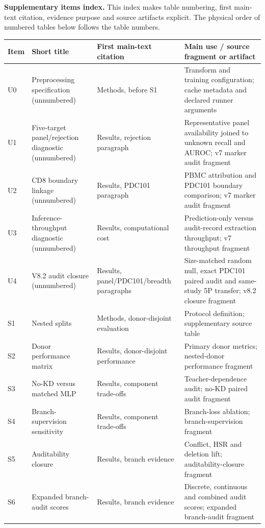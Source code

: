 \documentclass[10pt]{article}
\begin{document}
\begin{center}
\textbf{Supplementary items index.} This index makes table numbering, first main-text citation, evidence purpose and source artifacts explicit. The physical order of numbered tables below follows the table numbers.

\scriptsize
\setlength{\tabcolsep}{2.5pt}
\begin{tabularx}{\textwidth}{lllX}
\toprule
Item & Short title & First main-text citation & Main use / source fragment or artifact \\
\midrule
U0 & Preprocessing specification (unnumbered) & Methods, before S1 & Transform and training configuration; cache metadata and declared runner arguments \\
U1 & Five-target panel/rejection diagnostic (unnumbered) & Results, rejection paragraph & Representative panel availability joined to unknown recall and AUROC; v7 marker audit fragment \\
U2 & CD8 boundary linkage (unnumbered) & Results, PDC101 paragraph & PBMC attribution and PDC101 boundary comparison; v7 marker audit fragment \\
U3 & Inference-throughput diagnostic (unnumbered) & Results, computational cost & Prediction-only versus audit-record extraction throughput; v7 throughput fragment \\
U4 & V8.2 audit closure (unnumbered) & Results, panel/PDC101/breadth paragraphs & Size-matched random null, exact PDC101 paired audit and same-study 5P transfer; v8.2 closure fragment \\
S1 & Nested splits & Methods, donor-disjoint evaluation & Protocol definition; supplementary source table \\
S2 & Donor performance matrix & Results, donor-disjoint performance & Primary donor metrics; nested-donor performance fragment \\
S3 & No-KD versus matched MLP & Results, component trade-offs & Teacher-dependence audit; no-KD paired audit fragment \\
S4 & Branch-supervision sensitivity & Results, component trade-offs & Branch-loss ablation; branch-supervision fragment \\
S5 & Auditability closure & Results, branch evidence & Conflict, HSR and deletion lift; auditability-closure fragment \\
S6 & Expanded branch-audit scores & Results, branch evidence & Discrete, continuous and combined audit scores; expanded branch-audit fragment \\

\end{tabularx}
\end{center}
\end{document}
